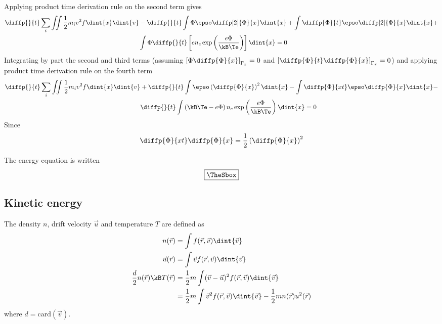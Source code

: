 \documentclass[10pt,a4paper]{article}
\newlength{\mylength}
\newenvironment{falign}%
{\setlength{\fboxsep}{15pt}
\setlength{\fboxrule}{0.5pt}
\setlength{\mylength}{\textwidth}
\addtolength{\mylength}{-2\fboxsep}
\addtolength{\mylength}{-2\fboxrule}
\Sbox
\minipage{\mylength}%
  \setlength{\abovedisplayskip}{-2\lineskip}
	\setlength{\belowdisplayskip}{-2\lineskip}
\align}%
{\endalign\endminipage\endSbox
\[\fbox{\TheSbox}\]}
\begin{document}
Applying product time derivation rule on the second term gives
\begin{align}
\diffp{}{t}
\sum_i\iint\frac{1}{2}m_iv^2f\dint{x}\dint{v}&-
\diffp{}{t}\int\Phi\epso\diffp[2]{\Phi}{x}\dint{x}+
\int\diffp{\Phi}{t}\epso\diffp[2]{\Phi}{x}\dint{x}+\nonumber\\
&\int\Phi\diffp{}{t}\left[en_e\exp\left(\frac{e\Phi}{\kB\Te}\right)\right]
\dint{x}=0\\
\end{align}
Integrating by part the second and third terms (assuming 
$\left[\Phi\diffp{\Phi}{x}\right]_{\Gamma_x}=0$ and 
$\left[\diffp{\Phi}{t}\diffp{\Phi}{x}\right]_{\Gamma_x}=0$) 
and applying product time derivation rule on the fourth term
\begin{align}
\diffp{}{t}\sum_i\iint\frac{1}{2}m_iv^2f\dint{x}\dint{v}&+
\diffp{}{t}\int\epso\left(\diffp{\Phi}{x}\right)^2\dint{x}-
\int\diffp{\Phi}{xt}\epso\diffp{\Phi}{x}\dint{x}-\nonumber\\
&\diffp{}{t}\int\left(\kB\Te-e\Phi\right)
n_e\exp\left(\frac{e\Phi}{\kB\Te}\right)\dint{x}=0
\end{align}
Since 
\begin{equation}
\diffp{\Phi}{xt}\diffp{\Phi}{x}=\frac{1}{2}\left(\diffp{\Phi}{x}\right)^2
\end{equation}

The energy equation is written
\begin{falign}
\end{falign}

\subsection{Kinetic energy}
The density $n$, drift velocity $\vec{u}$ and temperature $T$ are defined as 
\begin{align}
n(\vec{r})&=\int f(\vec{r},\vec{v})\dint{\vec{v}}\\
\vec{u}(\vec{r})&=\int\vec{v} f(\vec{r},\vec{v})\dint{\vec{v}}\\
\frac{d}{2}n(\vec{r})\kB T(\vec{r})&=\frac{1}{2}m\int(\vec{v}-\vec{u})^2
f(\vec{r},\vec{v})\dint{\vec{v}}\\
&=\frac{1}{2}m\int\vec{v}^2 f(\vec{r},\vec{v})\dint{\vec{v}}
-\frac{1}{2}mn(\vec{r})u^2(\vec{r}) 
\end{align}
where $d=\mathrm{card}(\vec{v})$.
\end{document}
